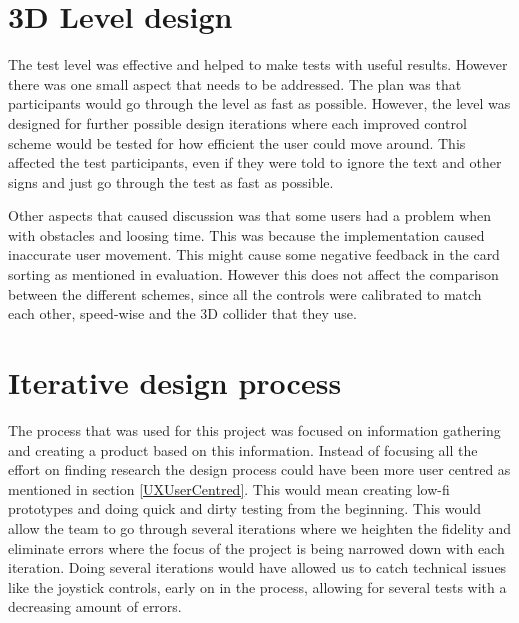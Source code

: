 \section*{3D Level design}
The test level was effective and helped to make tests with useful results. However there was one small aspect that needs to be addressed. The plan was that participants would go through the level as fast as possible. However, the level was designed for further possible design iterations where each improved control scheme would be tested for how efficient the user could move around. This affected the test participants, even if they were told to ignore the text and other signs and just go through the test as fast as possible. 

Other aspects that caused discussion was that some users had a problem when with obstacles and loosing time. This was because the implementation caused inaccurate user movement. 
This might cause some negative feedback in the card sorting as mentioned in evaluation. However this does not affect the comparison between the different schemes, since all the controls were calibrated to match each other, speed-wise and the 3D collider that they use. 

\section*{Iterative design process}
The process that was used for this project was focused on information gathering and creating a product based on this information.
Instead of focusing all the effort on finding research the design process could have been more user 
centred as mentioned in section \ref{UXUserCentred}.
This would mean creating low-fi prototypes and doing quick and dirty testing from the beginning. This 
would allow the team to go through several iterations where we heighten the fidelity and eliminate errors 
where the focus of the project is being narrowed down with each iteration. Doing several iterations 
would have allowed us to catch technical issues like the joystick controls, early on 
in the process, allowing for several tests with a decreasing amount of errors.
